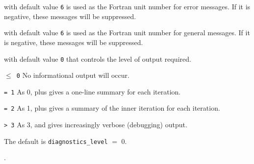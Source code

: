 \documentclass{spec}
\begin{document}
\begin{description}

 with default value {\tt 6}
is used as the Fortran unit number for error messages. If it is negative, these
messages will be suppressed.  

 with default value {\tt 6}
is used as the Fortran unit number for general messages. If it is negative, these messages will be suppressed. 

 with default value {\tt 0} that 
controls the level of output required. 
\begin{description} 
\item{\tt $\leq$ 0} No informational output will occur.
\item{\tt = 1} As 0, plus gives a one-line summary for each iteration.
\item{\tt = 2} As 1, plus gives a summary of the inner iteration for each iteration.
\item{\tt > 3} As 3, and gives increasingly verbose (debugging) output.
\end{description}
The default is {\tt diagnostics\_level} $=$ 0.
\end{description}

.
\end{document}
